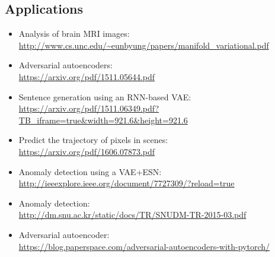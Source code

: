 \documentclass[]{article}
\begin{document}
\subsection{Applications}
\begin{itemize}
	\item Analysis of brain MRI images:\\
	\url{http://www.cs.unc.edu/~eunbyung/papers/manifold_variational.pdf}
	
	\item Adversarial autoencoders:\\
	\url{https://arxiv.org/pdf/1511.05644.pdf}
	
	\item Sentence generation using an RNN-based VAE:\\
	\url{https://arxiv.org/pdf/1511.06349.pdf?TB_iframe=true&width=921.6&height=921.6}
	
	\item Predict the trajectory of pixels in scenes:\\
	\url{https://arxiv.org/pdf/1606.07873.pdf}
	
	\item Anomaly detection using a VAE+ESN:\\
	\url{http://ieeexplore.ieee.org/document/7727309/?reload=true}
	
	\item Anomaly detection:\\
	\url{http://dm.snu.ac.kr/static/docs/TR/SNUDM-TR-2015-03.pdf} 
	
	\item Adversarial autoencoder:\\
	\url{https://blog.paperspace.com/adversarial-autoencoders-with-pytorch/}
\end{itemize}
\end{document}
